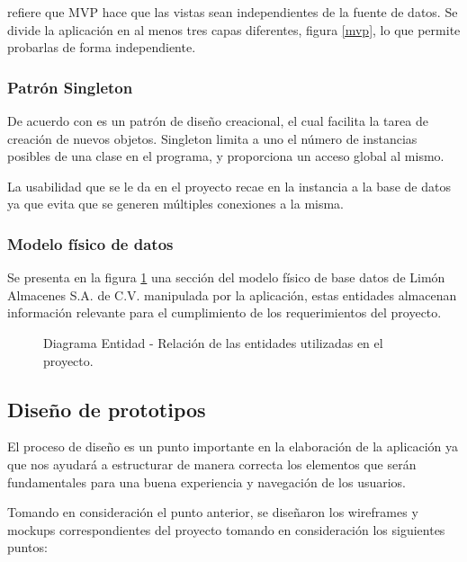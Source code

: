 \textcite{MVP} refiere que MVP hace que las vistas sean independientes de la fuente de datos. Se divide la aplicación en al menos tres capas diferentes, figura \ref{mvp}, lo que permite probarlas de forma independiente.

\subsubsection{Patrón Singleton}
De acuerdo con \textcite{Singleton} es un patrón de diseño creacional, el cual facilita la tarea de creación de nuevos objetos. Singleton limita a uno el número de instancias posibles de una clase en el programa, y proporciona un acceso global al mismo.

La usabilidad que se le da en el proyecto recae en la instancia a la base de datos ya que evita que se generen múltiples conexiones a la misma.

\subsubsection{Modelo físico de datos}
Se presenta en la figura \ref{er_articulo} una sección del modelo físico de base datos de Limón Almacenes S.A. de C.V. manipulada por la aplicación, estas entidades almacenan información relevante para el cumplimiento de los requerimientos del proyecto.

\begin{figure}[h]
	\centering
	
	\caption{Diagrama Entidad - Relación de las entidades utilizadas en el proyecto.}
	\label{er_articulo}
\end{figure}

\subsection{Diseño de prototipos}
\label{subsec:prototipos}
El proceso de diseño es un punto importante en la elaboración de la aplicación ya que nos ayudará a estructurar de manera correcta los elementos que serán fundamentales para una buena experiencia y navegación de los usuarios.

Tomando en consideración el punto anterior, se diseñaron los wireframes y mockups correspondientes del proyecto tomando en consideración los siguientes puntos:

